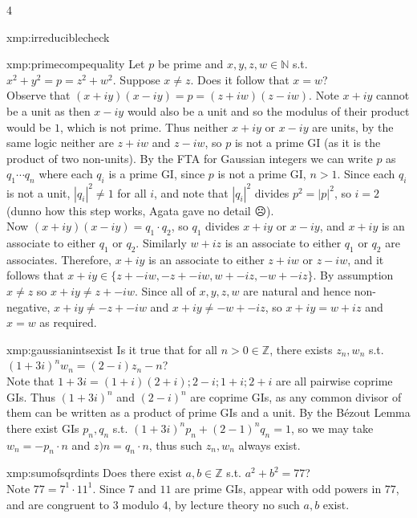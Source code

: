 \documentclass[landscape, 8pt]{extarticle}
\begin{document}
\begin{multicols*}{4}
\begin{xmp}{xmp:irreduciblecheck}{ }
		\end{xmp}
		
		
		\begin{xmp}{xmp:primecompequality}{ }
			Let $p$ be prime and $x, y, z, w\in \mathbb{N}$ s.t. $x^2 + y^2 = p = z^2 + w^2$. Suppose $x \ne z$. Does it follow that $x = w$?\\
			Observe that $(x + iy)(x-iy) = p = (z+iw)(z-iw)$. Note $x+iy$ cannot be a unit as then $x-iy$ would also be a unit and so the modulus of their product would be $1$, which is not prime. Thus neither $x+iy$ or $x-iy$ are units, by the same logic neither are $z +iw$ and $z-iw$, so $p$ is not a prime GI (as it is the product of two non-units). By the FTA for Gaussian integers we can write $p$ as $q_1\cdots q_n$ where each $q_i$ is a prime GI, since $p$ is not a prime GI, $n>1$. Since each $q_i$ is not a unit, $\left|q_i\right|^2 \ne 1$ for all $i$, and note that $\left|q_i\right|^2$ divides $p^2 = \left|p\right|^2$, so $i=2$ (dunno how this step works, Agata gave no detail {\footnotesize $\frownie$}).\\
			Now $(x+iy)(x-iy) = q_1\cdot q_2$, so $q_1$ divides $x+iy$ or $x-iy$, and $x+iy$ is an associate to either $q_1$ or $q_2$. Similarly $w+iz$ is an associate to either $q_1$ or $q_2$ are associates. Therefore, $x+iy$ is an associate to either $z+iw$ or $z-iw$, and it follows that $x+iy\in \{z+ -iw, -z+-iw, w+-iz, -w+-iz\}$. By assumption $x\ne z$ so $x+iy \ne z+-iw$. Since all of $x, y, z, w$ are natural and hence non-negative, $x+iy \ne -z + -iw$ and $x+iy \ne -w+-iz$, so $x+iy = w+iz$ and $x=w$ as required.
			 
		\end{xmp}
		
		
		\begin{xmp}{xmp:gaussianintsexist}{ }
			Is it true that for all $n > 0\in \mathbb{Z}$, there exists $z_n, w_n$ s.t. $(1+3i)^nw_n = (2-i)z_n -n$?\\
			Note that $1+3i = (1+i)(2+i); 2-i; 1+i; 2+i$ are all pairwise coprime GIs. Thus $(1+3i)^n$ and $(2-i)^n$ are coprime GIs, as any common divisor of them can be written as a product of prime GIs and a unit. By the B\'ezout Lemma there exist GIs $p_n, q_n$ s.t. $(1+3i)^np_n + (2-1)^nq_n = 1$, so we may take $w_n = -p_n\cdot n$ and $z)n = q_n \cdot n$, thus such $z_n, w_n$ always exist.
			
		\end{xmp}
		
		
		\begin{xmp}{xmp:sumofsqrdints}{ }
			Does there exist $a, b\in \mathbb{Z}$ s.t. $a^2 +b^2 = 77$?\\
			Note $77 = 7^1 \cdot 11^1$. Since $7$ and $11$ are prime GIs, appear with odd powers in $77$, and are congruent to $3$ modulo $4$, by lecture theory no such $a, b$ exist.
			

\end{xmp}
\end{multicols*}
\end{document}
